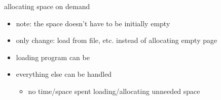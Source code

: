 \begin{frame}{allocating space on demand}
\begin{itemize}
\item note: the space doesn't have to be initially empty
\item only change: load from file, etc. instead of allocating empty page
\vspace{.5cm}
\item loading program can be 
\item everything else can be handled 
    \begin{itemize}
    \item no time/space spent loading/allocating unneeded space
    \end{itemize}
\end{itemize}
\end{frame}
